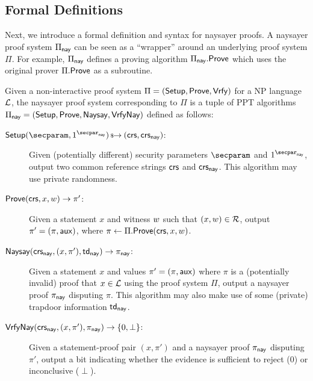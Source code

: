\subsection{Formal Definitions}\label{sec:naysayer_def}

Next, we introduce a formal definition and syntax for naysayer proofs. A naysayer proof system $\Pi_{\mathsf{nay}}$ can be seen as a ``wrapper'' around an underlying proof system $\Pi$. For example, $\Pi_{\sf nay}$ defines a proving algorithm $\Pi_{\mathsf{nay}}.\mathsf{Prove}$ which uses the original prover $\Pi.\mathsf{Prove}$ as a subroutine.

\begin{definition}\label{def:naysayer_proof}
Given a non-interactive proof system $\Pi = (\mathsf{Setup}, \mathsf{Prove}, \mathsf{Vrfy})$ for a NP language $\mathcal{L}$, the naysayer proof system corresponding to $\Pi$ is a tuple of PPT algorithms $\Pi_{\mathsf{nay}} = (\mathsf{Setup}, \mathsf{Prove},\allowbreak \mathsf{Naysay}, {\mathsf{Vrfy}}\mathsf{Nay})$ defined as follows:
    \begin{description}
        \item[$\setup(\secparam, \naysecparam) \randout (\crs,\crs_{\nay})$:] Given (potentially different) security parameters $\secparam$ and $\naysecparam$, output two common reference strings $\mathsf{crs}$ and $\mathsf{crs}_{\mathsf{nay}}$. This algorithm may use private randomness.
        \item[$\mathsf{Prove}(\mathsf{crs}, x, w) \to \pi'$:] Given a statement $x$ and witness $w$ such that $(x,\allowbreak w) \in \mathcal{R}$, 
        output $\pi' = (\pi, \mathsf{aux})$, where $\pi \gets \Pi.\mathsf{Prove}(\mathsf{crs}, x, w)$.
        \item[$\mathsf{Naysay}(\mathsf{crs}_{\mathsf{nay}}, (x,\pi'), \mathsf{td}_{\mathsf{nay}}) \rightarrow \pi_{\mathsf{nay}}$:] Given a statement $x$ and values $\pi' = (\pi,\allowbreak \mathsf{aux})$ where $\pi$ is a (potentially invalid) proof that $x \in \mathcal{L}$ using the proof system $\Pi$, output a naysayer proof $\pi_{\mathsf{nay}}$ disputing $\pi$. This algorithm may also make use of some (private) trapdoor information $\mathsf{td}_{\mathsf{nay}}$.
        \item[${\mathsf{Vrfy}}\mathsf{Nay}(\mathsf{crs}_{\mathsf{nay}}, (x,\pi'), \pi_{\mathsf{nay}}) \rightarrow \{0, \perp\}$:] Given a statement-proof pair $(x,\allowbreak \pi')$ and a naysayer proof $\pi_{\mathsf{nay}}$ disputing $\pi'$, output a bit indicating whether the evidence is sufficient to reject (0) or inconclusive ($\perp$).
    \end{description}
\end{definition}

